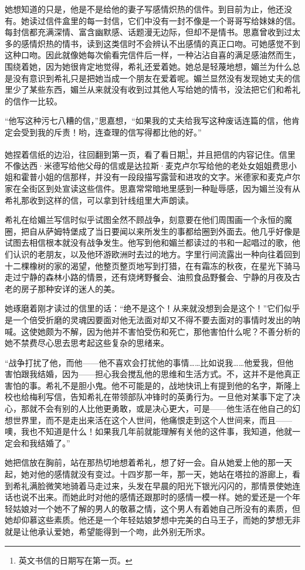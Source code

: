 \par 她想知道的只是，他是不是给他的妻子写感情炽热的信件。到目前为止，他还没有。她读过信件盒里的每一封信，它们中没有一封不像是一个哥哥写给妹妹的信。每封信都充满深情、富含幽默感、话题漫无边际，但却不是情书。思嘉曾收到过太多的感情炽热的情书，读到这类信时不会辨认不出感情的真正口吻。可她感觉不到这种口吻。因此就像她每次偷看完信件后一样，一种沾沾自喜的满足感油然而生，围绕着她，因为她很肯定地觉得，希礼还爱着她。她总是轻蔑地想，媚兰为什么总是没有意识到希礼只是把她当成一个朋友在爱着呢。媚兰显然没有发现她丈夫的信里少了某些东西，媚兰从来就没有收到过其他人写给她的情书，没法把它们和希礼的信作一比较。
\par “他写这种污七八糟的信，”思嘉想，“如果我的丈夫给我写这种废话连篇的信，他肯定会受到我的斥责！哟，连查理的信写得都比他的好。”
\par 她捏着信纸的边沿，往回翻到第一页，看了看日期\footnote{英文书信的日期写在第一页。}，并且把信的内容记住。信里不像达西·米德写给他父母的信或是达拉斯·麦克卢尔写给他的老处女姐姐费思小姐和霍普小姐的信那样，并没有一段段描写露营和进攻的文字。米德家和麦克卢尔家在全街区到处宣读这些信件。思嘉常常暗地里感到一种耻辱感，因为媚兰没有从希礼那收到这样的信，可以拿到针线组里大声朗读。
\par 希礼在给媚兰写信时似乎试图全然不顾战争，刻意要在他们周围画一个永恒的魔圈，把自从萨姆特堡成了当日要闻以来所发生的事都给圈到外面去。他几乎好像是试图去相信根本就没有战争发生。他写到他和媚兰都读过的书和一起唱过的歌，他们认识的老朋友，以及他环游欧洲时去过的地方。字里行间流露出一种向往着回到十二棵橡树的家的渴望，他整页整页地写到打猎，在有霜冻的秋夜，在星光下骑马走过宁静的森林小路的情景，还有烧烤野餐会、油煎食品野餐会、宁静的月夜及古老的房子那种安详的迷人的美。
\par 她琢磨着刚才读过的信里的话：“绝不是这个！从来就没想到会是这个！”它们似乎是一个倍受折磨的灵魂因要面对他无法面对却又不得不要去面对的事情时发出的呐喊。这使她颇为不解，因为他并不害怕受伤和死亡，那他害怕什么呢？不善分析的她不禁费尽心思去思考起这些复杂的思绪来。
\par “战争打扰了他，而他——他不喜欢会打扰他的事情……比如说我……他爱我，但他害怕跟我结婚，因为——担心我会搅乱他的思维和生活方式。不，这并不是他真正害怕的事。希礼不是胆小鬼。他不可能是的，战地快讯上有提到他的名字，斯隆上校也给梅利写信，告知希礼在带领部队冲锋时的英勇行为。一旦他对某事下定了决心，那就不会有别的人比他更勇敢，或是决心更大，可是——他生活在他自己的幻想世界里，而不是走出来活在这个人世间，他痛恨走到这个人世间来，而且——噢，我也不知道是什么！如果我几年前就能理解有关他的这件事，我知道，他就一定会和我结婚了。”
\par 她把信放在胸前，站在那热切地想着希礼，想了好一会。自从她爱上他的那一天起，她对他的感情就没有变过。十四岁那一年，那一天，她站在塔拉的游廊上，看到希礼满脸微笑地骑着马走过来，头发在早晨的阳光下银光闪闪的，那情景使她连话也说不出来。而她此时对他的感情还跟那时的感情一模一样。她的爱还是一个年轻姑娘对一个她不了解的男人的敬慕之情，这个男人有着她自己所没有的素质，但她却仰慕这些素质。他还是一个年轻姑娘梦想中完美的白马王子，而她的梦想无非就是让他承认爱她，希望能得到一个吻，此外别无所求。
